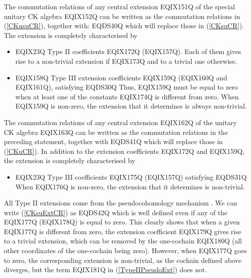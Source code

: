 \begin{theorem}
\label{theor4.1}
The  commutation relations of any central extension
EQIX151Q of the special unitary CK algebra
EQIX152Q can be written as the commutation relations in
(\ref{CKusuCR}), together with:
EQDS40Q
which will replace those in (\ref{CKsuCR}). The extension is
completely characterised by

\begin{itemize}
\item EQIX23Q Type II coefficients EQIX172Q (EQIX157Q).
Each of them gives rise to a non-trivial extension if
EQIX173Q and to a trivial one otherwise.

\item EQIX158Q Type III extension coefficients EQIX159Q
(EQIX160Q and
EQIX161Q), satisfying
EQDS30Q
Thus, EQIX159Q must be equal to zero when at least one of the
constants EQIX174Q is different from zero. When EQIX159Q is
non-zero, the extension that it determines is always non-trivial.
\end{itemize}
\end{theorem}

\begin{theorem}
\label{theor4.2}
The  commutation relations of any central extension
EQIX162Q of the unitary CK algebra
EQIX163Q can be written as the commutation relations in
the preceding statement, together with
EQDS41Q
which will replace those in (\ref{CKuCR}). In addition to the
extension coefficients EQIX172Q and EQIX159Q, the
extension is completely characterised by
\begin{itemize}
\item
EQIX23Q Type III coefficients EQIX175Q (EQIX157Q) satisfying
EQDS31Q
When EQIX176Q is non-zero, the extension that it determines is non-trivial.
\end{itemize}
\end{theorem}

All Type II extensions come from the pseudocohomology mechanism
\cite{Ald.Azc:85b,Azc.Izq:95}. We can write (\ref{CKsuExtCR}) as
EQDS42Q
which is well defined even if any of the EQIX177Q
(EQIX178Q) is equal to zero.
This clearly shows that when a given
EQIX177Q  is different from zero, the extension
coefficient
EQIX179Q gives rise to a trivial extension, which can be
removed by the one-cochain
EQIX180Q (all other coordinates of the
one-cochain being zero). However, when EQIX177Q goes to zero, the
corresponding extension is non-trivial, as the cochain  defined above
diverges, but the term EQIX181Q
in (\ref{TypeIIPseudoExt}) does not.

